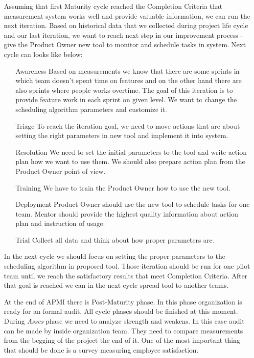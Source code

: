 Assuming that first Maturity cycle reached the Completion Criteria that measurement system works well and provide valuable information, we can run the next iteration. Based on historical data that we collected during project life cycle and our last iteration, we want to reach next step in our improvement process - give the Product Owner new tool to monitor and schedule tasks in system. Next cycle can looks like below:

\begin{enumerate}
\item[Awareness] Based on measurements we know that there are some sprints in which team doesn't spent time on features and on the other hand there are also sprints where people works overtime. The goal of this iteration is to provide feature work in each sprint on given level. We want to change the scheduling algorithm parameters and customize it.
\item[Triage] To reach the iteration goal, we need to move actions that are about setting the right parameters in new tool and implement it into system.
\item[Resolution] We need to set the initial parameters to the tool and write action plan how we want to use them. We should also prepare action plan from the Product Owner point of view.
\item[Training] We have to train the Product Owner how to use the new tool. 
\item[Deployment] Product Owner should use the new tool to schedule tasks for one team. Mentor should provide the highest quality information about action plan and instruction of usage. 
\item[Trial] Collect all data and think about how proper parameters are.
\end{enumerate}
In the next cycle we should focus on setting the proper parameters to the scheduling algorithm in proposed tool. Those iteration should be run for one pilot team until we reach the satisfactory results that meet Completion Criteria. After that goal is reached we can in the next cycle spread tool to another teams. 

At the end of APMI there is Post-Maturity phase. In this phase organization is ready for an formal audit. All cycle phases should be finished at this moment. During \textit{Asses} phase we need to analyze strength and weakens. In this case audit can be made by inside organization team. They need to compare measurements from the begging of the project the end of it. One of the most important thing that should be done is a survey measuring employee satisfaction.

